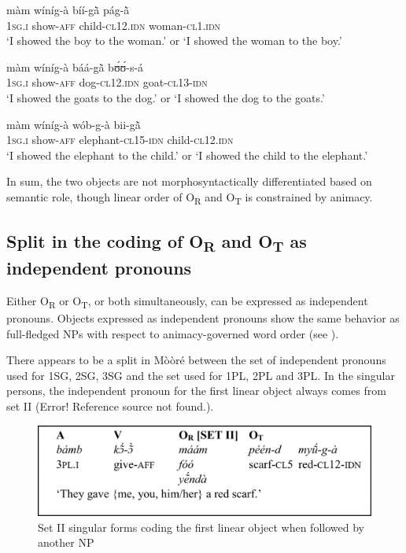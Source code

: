 \documentclass[output=paper]{langsci/langscibook}
\begin{document}
\ea
\label{ex:16.pacchiarotti}
\gll m\`{a}m    w\'{i}n\'{i}g-\`{a}    b\'{i}\'{i}-g\`{\~{a}}      p\'{a}g-\`{\~{a}} \\
\textsc{1sg.i  }  show-\textsc{aff}    child-\textsc{cl12.idn}  woman-\textsc{cl1.idn}\\
\glt`I showed the boy to the woman.' or `I showed the woman to the boy.'
\z

\ea
\label{ex:17.pacchiarotti}
\gll m\`{a}m    w\'{i}n\'{i}g-\`{a}    b\'{a}\'{a}-g\`{\~{a}}    bʊ́ʊ́-s-\'{a} \\
\textsc{1sg.i  }  show-\textsc{aff}    dog-\textsc{cl12.idn}  goat-\textsc{cl13-idn}\\
\glt`I showed the goats to the dog.' or `I showed the dog to the goats.'  
\z

\ea
\label{ex:18.pacchiarotti}
\gll m\`{a}m    w\'{i}n\'{i}g-\`{a}    w\'{o}b-g-\`{a}    bii-g\`{\~{a}} \\
\textsc{1sg.i  }  show-\textsc{aff}    elephant-\textsc{cl15-idn}  child-\textsc{cl12.idn}\\
\glt `I showed the elephant to the child.' or `I showed the child to the elephant.'
\z

In sum, the two objects are not morphosyntactically differentiated based on semantic role, though linear order of O\textsubscript{R} and O\textsubscript{T} is constrained by animacy.

\subsection{Split in the coding of O\textsubscript{R} and O\textsubscript{T} as independent pronouns}\label{§4.3:split.pacchiarotti}

Either O\textsubscript{R} or O\textsubscript{T}, or both simultaneously, can be expressed as independent pronouns. Objects expressed as independent pronouns show the same behavior as full-fledged NPs with respect to animacy-governed word order (see ). 

There appears to be a split in Mòòré between the set of independent pronouns used for 1SG, 2SG, 3SG and the set used for 1PL, 2PL and 3PL. In the singular persons, the independent pronoun for the first linear object always comes from set II (Error! Reference source not found.). 

\begin{figure}[h]
\includegraphics[width=\textwidth]{figures/pacchiarottifig1}
\caption{Set II singular forms coding the first linear object when followed by another NP}
\label{fig:1.pacchiarotti}
\end{figure}
\end{document}

